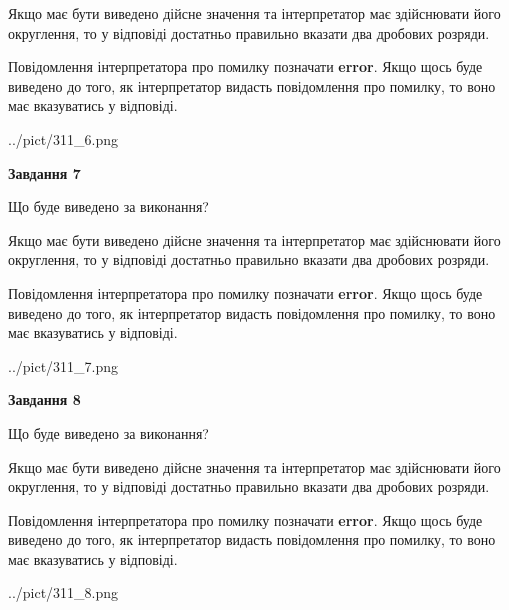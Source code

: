 \documentclass[12pt, ukrainian]{article}
\begin{document}
{\begin {Large}
Якщо має бути виведено дійсне значення та інтерпретатор має здійснювати його округлення, 
то у відповіді достатньо правильно вказати два дробових розряди.

Повідомлення інтерпретатора про помилку позначати \textbf{error}.
Якщо щось буде виведено до того, як інтерпретатор видасть повідомлення про помилку, 
то воно має вказуватись у відповіді. \par

\begin{center}
	{../pict/311_6.png}
\end{center}
\newpage

{\begin {center}\textbf{Завдання 7}\end {center}}\par
Що буде виведено за виконання? \par

Якщо має бути виведено дійсне значення та інтерпретатор має здійснювати його округлення, 
то у відповіді достатньо правильно вказати два дробових розряди.

Повідомлення інтерпретатора про помилку позначати \textbf{error}.
Якщо щось буде виведено до того, як інтерпретатор видасть повідомлення про помилку, 
то воно має вказуватись у відповіді. \par

\begin{center}
	{../pict/311_7.png}
\end{center}
\newpage

{\begin {center}\textbf{Завдання 8}\end {center}}\par
Що буде виведено за виконання? \par

Якщо має бути виведено дійсне значення та інтерпретатор має здійснювати його округлення, 
то у відповіді достатньо правильно вказати два дробових розряди.

Повідомлення інтерпретатора про помилку позначати \textbf{error}.
Якщо щось буде виведено до того, як інтерпретатор видасть повідомлення про помилку, 
то воно має вказуватись у відповіді. \par

\begin{center}
	{../pict/311_8.png}
\end{center}
\newpage


\end{Large}}
\end{document}
